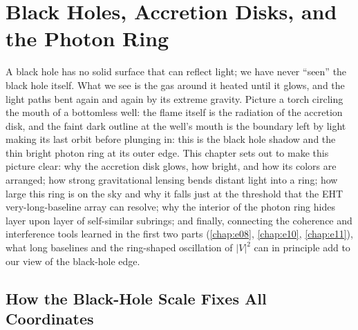 \chapter{Black Holes, Accretion Disks, and the Photon Ring}
\label{chap:e19}

\begin{chapteropening}
A black hole has no solid surface that can reflect light; we have never ``seen'' the black hole itself. What we see is the gas around it heated until it glows, and the light paths bent again and again by its extreme gravity. Picture a torch circling the mouth of a bottomless well: the flame itself is the radiation of the accretion disk, and the faint dark outline at the well's mouth is the boundary left by light making its last orbit before plunging in: this is the black hole shadow and the thin bright photon ring at its outer edge. This chapter sets out to make this picture clear: why the accretion disk glows, how bright, and how its colors are arranged; how strong gravitational lensing bends distant light into a ring; how large this ring is on the sky and why it falls just at the threshold that the EHT very-long-baseline array can resolve; why the interior of the photon ring hides layer upon layer of self-similar subrings; and finally, connecting the coherence and interference tools learned in the first two parts (\ref{chap:e08}, \ref{chap:e10}, \ref{chap:e11}), what long baselines and the ring-shaped oscillation of \(|V|^2\) can in principle add to our view of the black-hole edge.
\end{chapteropening}

\section{How the Black-Hole Scale Fixes All Coordinates}
\label{sec:e19-scales}

